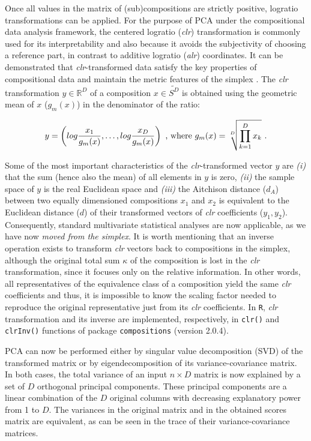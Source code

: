\documentclass[
  openany]{book}
\begin{document}
Once all values in the matrix of (sub)compositions are strictly positive, logratio transformations can be applied. For the purpose of PCA under the compositional data analysis framework, the centered logratio (\emph{clr}) transformation is commonly used \autocite{Quinn2018} for its interpretability and also because it avoids the subjectivity of choosing a reference part, in contrast to additive logratio (\emph{alr}) coordinates. It can be demonstrated that \emph{clr}-transformed data satisfy the key properties of compositional data and maintain the metric features of the simplex \autocite{Filzmoser2018c}. The \emph{clr} transformation \(y \in \mathbb{R}^D\) of a composition \(x \in \tilde{S^D}\) is obtained using the geometric mean of \(x\) (\(g_m(x)\)) in the denominator of the ratio:

\begin{equation} 
  y = \left(log\frac{x_1}{g_m(x)}, \ldots, log\frac{x_D}{g_m(x)}\right)\text{ , where } g_m(x) = \sqrt[D]{\prod^D_{k=1}x_k}\text{ .}\\
  \label{eq:clr}
\end{equation}

Some of the most important characteristics of the \emph{clr}-transformed vector \(y\) are \emph{(i)} that the sum (hence also the mean) of all elements in \(y\) is zero, \emph{(ii)} the sample space of \(y\) is the real Euclidean space and \emph{(iii)} the Aitchison distance (\(d_A\)) between two equally dimensioned compositions \(x_1\) and \(x_2\) is equivalent to the Euclidean distance (\(d\)) of their transformed vectors of \emph{clr} coefficients (\(y_1,y_2\)). Consequently, standard multivariate statistical analyses are now applicable, as we have now \emph{moved from the simplex}. It is worth mentioning that an inverse operation exists to transform \emph{clr} vectors back to compositions in the simplex, although the original total sum \(\kappa\) of the composition is lost in the \emph{clr} transformation, since it focuses only on the relative information. In other words, all representatives of the equivalence class of a composition yield the same \emph{clr} coefficients and thus, it is impossible to know the scaling factor needed to reproduce the original representative just from its \emph{clr} coefficients. In \texttt{R}, \emph{clr} transformation and its inverse are implemented, respectively, in \texttt{clr()} and \texttt{clrInv()} functions of package \texttt{compositions} (version 2.0.4).

PCA can now be performed either by singular value decomposition (SVD) of the transformed matrix or by eigendecomposition of its variance-covariance matrix. In both cases, the total variance of an input \(n \times D\) matrix is now explained by a set of \(D\) orthogonal principal components. These principal components are a linear combination of the \(D\) original columns with decreasing explanatory power from 1 to \(D\). The variances in the original matrix and in the obtained scores matrix are equivalent, as can be seen in the trace of their variance-covariance matrices.
\end{document}
